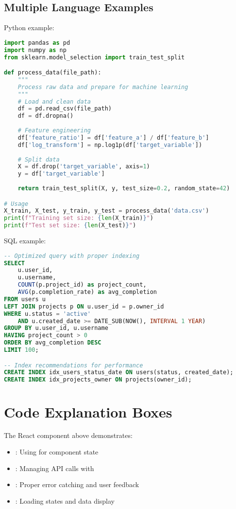 \documentclass{internshipreport}
\begin{document}
\subsection{Multiple Language Examples}

Python example:

\begin{lstlisting}[language=Python, caption=Data Processing Script]
import pandas as pd
import numpy as np
from sklearn.model_selection import train_test_split

def process_data(file_path):
    """
    Process raw data and prepare for machine learning
    """
    # Load and clean data
    df = pd.read_csv(file_path)
    df = df.dropna()
    
    # Feature engineering
    df['feature_ratio'] = df['feature_a'] / df['feature_b']
    df['log_transform'] = np.log1p(df['target_variable'])
    
    # Split data
    X = df.drop('target_variable', axis=1)
    y = df['target_variable']
    
    return train_test_split(X, y, test_size=0.2, random_state=42)

# Usage
X_train, X_test, y_train, y_test = process_data('data.csv')
print(f"Training set size: {len(X_train)}")
print(f"Test set size: {len(X_test)}")
\end{lstlisting}

SQL example:

\begin{lstlisting}[language=SQL, caption=Database Query Optimization]
-- Optimized query with proper indexing
SELECT 
    u.user_id,
    u.username,
    COUNT(p.project_id) as project_count,
    AVG(p.completion_rate) as avg_completion
FROM users u
LEFT JOIN projects p ON u.user_id = p.owner_id
WHERE u.status = 'active'
    AND u.created_date >= DATE_SUB(NOW(), INTERVAL 1 YEAR)
GROUP BY u.user_id, u.username
HAVING project_count > 0
ORDER BY avg_completion DESC
LIMIT 100;

-- Index recommendations for performance
CREATE INDEX idx_users_status_date ON users(status, created_date);
CREATE INDEX idx_projects_owner ON projects(owner_id);
\end{lstlisting}

\section{Code Explanation Boxes}

\begin{codeexplanation}
The React component above demonstrates:
\begin{itemize}
\item {}: Using  for component state
\item {}: Managing API calls with 
\item {}: Proper error catching and user feedback
\item {}: Loading states and data display
\end{itemize}
\end{codeexplanation}
\end{document}
